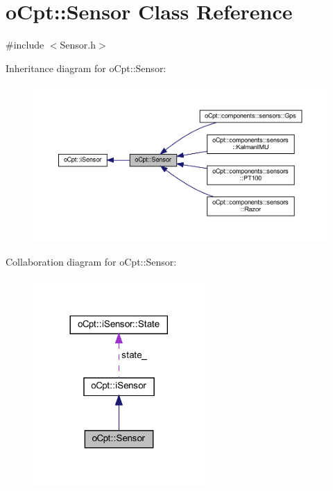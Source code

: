 \hypertarget{classo_cpt_1_1_sensor}{}\section{o\+Cpt\+:\+:Sensor Class Reference}
\label{classo_cpt_1_1_sensor}


{\ttfamily \#include $<$Sensor.\+h$>$}



Inheritance diagram for o\+Cpt\+:\+:Sensor\+:
\nopagebreak
\begin{figure}[H]
\begin{center}
\leavevmode
\includegraphics[width=350pt]{classo_cpt_1_1_sensor__inherit__graph}
\end{center}
\end{figure}


Collaboration diagram for o\+Cpt\+:\+:Sensor\+:
\nopagebreak
\begin{figure}[H]
\begin{center}
\leavevmode
\includegraphics[width=185pt]{classo_cpt_1_1_sensor__coll__graph}
\end{center}
\end{figure}
